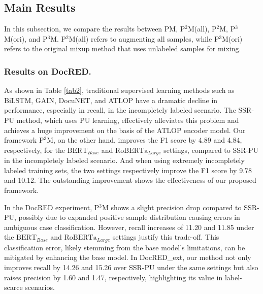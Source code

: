 \documentclass[letterpaper]{article}
\begin{document}
\subsection{Main Results}\label{sec4.2}
In this subsection, we compare the results between PM, P$^{2}$M(all), P$^{2}$M, P$^{3}$M(ori), and P$^{3}$M. P$^{2}$M(all) refers to augmenting all samples, while P$^{3}$M(ori) refers to the original mixup method that uses unlabeled samples for mixing.

\subsubsection{Results on DocRED.}
As shown in Table \ref{tab2}, traditional supervised learning methods such as BiLSTM, GAIN, DocuNET, and ATLOP have a dramatic decline in performance, especially in recall, in the incompletely labeled scenario. The SSR-PU method, which uses PU learning, effectively alleviates this problem and achieves a huge improvement on the basis of the ATLOP encoder model. Our framework P$^{3}$M, on the other hand, improves the F1 score by 4.89 and 4.84, respectively, for the $\mathrm{BERT}_{Base}$ and $\mathrm{RoBERTa}_{Large}$ settings, compared to SSR-PU in the incompletely labeled scenario. And when using extremely incompletely labeled training sets, the two settings respectively improve the F1 score by 9.78 and 10.12. The outstanding improvement shows the effectiveness of our proposed framework.

In the DocRED experiment, P$^{3}$M shows a slight precision drop compared to SSR-PU, possibly due to expanded positive sample distribution causing errors in ambiguous case classification. However, recall increases of 11.20 and 11.85 under the $\mathrm{BERT}_{Base}$ and $\mathrm{RoBERTa}_{Large}$ settings justify this trade-off. This classification error, likely stemming from the base model's limitations, can be mitigated by enhancing the base model. In DocRED\_ext, our method not only improves recall by 14.26 and 15.26 over SSR-PU under the same settings but also raises precision by 1.60 and 1.47, respectively, highlighting its value in label-scarce scenarios.
\end{document}

